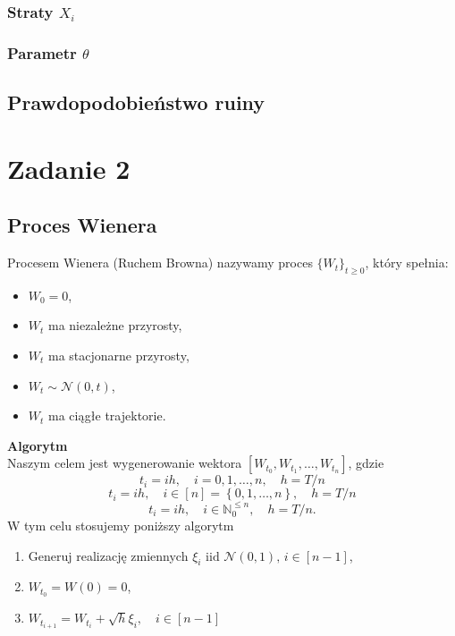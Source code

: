 \documentclass[12pt]{mwart}
\begin{document}
	\subsubsection{Straty {\boldmath $X_i$}}
	
	\subsubsection{Parametr {\boldmath $\theta$}}
	
	
	
	\subsection{Prawdopodobieństwo ruiny}
	
	
	
	
	\section{Zadanie 2}
	\subsection{Proces Wienera}
	\noindent Procesem Wienera (Ruchem Browna) nazywamy proces $\{W_t\}_{t\geqslant0}$, który spełnia:
	\begin{itemize}[leftmargin=10mm]%
		\item $W_0=0$,
		\item $W_t$ ma niezależne przyrosty,
		\item $W_t$ ma stacjonarne przyrosty,
		\item $W_t \sim \mathcal{N}(0, t)$,
		\item $W_t$ ma ciągłe trajektorie.
	\end{itemize}	
	\noindent \textbf{Algorytm}\\
	\noindent Naszym celem jest wygenerowanie wektora $\left[W_{t_0}, W_{t_1}, \dots, W_{t_n}\right]$, gdzie
	\begin{equation}
		t_i=ih, \quad i=0,1,\dots,n, \quad h=T/n
	\end{equation}
	\begin{equation}
		t_i=ih, \quad i\in\left[n\right]=\left\{0, 1, \dots, n\right\}, \quad h=T/n
	\end{equation}
	\begin{equation}
		t_i=ih, \quad i\in\mathbb{N}_0^{\leqslant n}, \quad h=T/n.
	\end{equation}
	W tym celu stosujemy poniższy algorytm
	\begin{enumerate}[leftmargin=10mm]
		\item Generuj realizację zmiennych $\xi_i\text{ iid }\mathcal{N}(0,1), \,i\in\left[n-1\right]$,
		\item $W_{t_0}=W\left(0\right)=0$,
		\item $W_{t_{i+1}} = W_{t_{i}}+\sqrt{h}\xi_i,\quad i\in\left[n-1\right]$%
	\end{enumerate}
\end{document}
